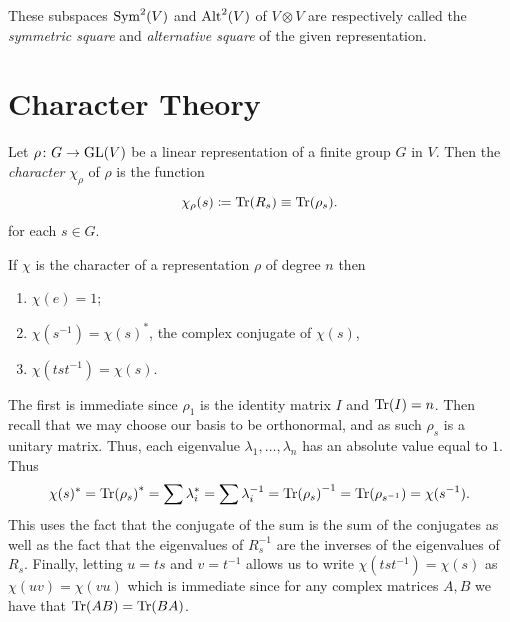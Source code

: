 \documentclass[letterpaper, 11pt, oneside]{book}
\begin{document}
\begin{defn}\label{defn:sym_alt_square}
  These subspaces $\operatorname{Sym}^{2}(V)$ and $\operatorname{Alt}^{2}(V)$ of $V \otimes V$ are respectively called the \emph{symmetric square} and \emph{alternative square} of the given representation.
\end{defn}

\chapter{Character Theory}

\begin{defn}[Character]
  Let $\rho\colon G \to \operatorname{GL}(V)$ be a linear representation of a finite group $G$ in $V$.
  Then the \emph{character} $\chi_{\rho}$ of $\rho$ is the function
  \[
    \chi_{\rho}(s) \coloneqq \Tr(R_{s}) \equiv \Tr(\rho_{s}).
  \]
  for each $s \in G$.
\end{defn}

\begin{prop}
  If $\chi$ is the character of a representation $\rho$ of degree $n$ then
  \begin{enumerate}
  \item $\chi(e) = 1$;
  \item $\chi(s^{-1}) = \chi(s)^{*}$, the complex conjugate of $\chi(s)$,
  \item $\chi(tst^{-1}) = \chi(s)$.
  \end{enumerate}
\end{prop}
\begin{pf}
  The first is immediate since $\rho_{1}$ is the identity matrix $I$ and $\Tr(I) = n$.
  Then recall that we may choose our basis to be orthonormal, and as such $\rho_{s}$ is a unitary matrix.
  Thus, each eigenvalue $\lambda_{1}, \ldots, \lambda_{n}$ has an absolute value equal to $1$.
  Thus
  \[
    \chi(s)^{*} = \Tr(\rho_{s})^{*} = \sum \lambda_{i}^{*} = \sum \lambda_{i}^{-1} = \Tr(\rho_{s})^{-1} = \Tr(\rho_{s^{-1}}) = \chi(s^{-1}).
  \]
  This uses the fact that the conjugate of the sum is the sum of the conjugates as well as the fact that the eigenvalues of $R_{s}^{-1}$ are the inverses of the eigenvalues of $R_{s}$.
  Finally, letting $u = ts$ and $v = t^{-1}$ allows us to write $\chi(tst^{-1}) = \chi(s)$ as $\chi(uv) = \chi(vu)$ which is immediate since for any complex matrices $A, B$ we have that $\Tr(AB) = \Tr(BA)$.
\end{pf}

\clearpage
\end{document}
